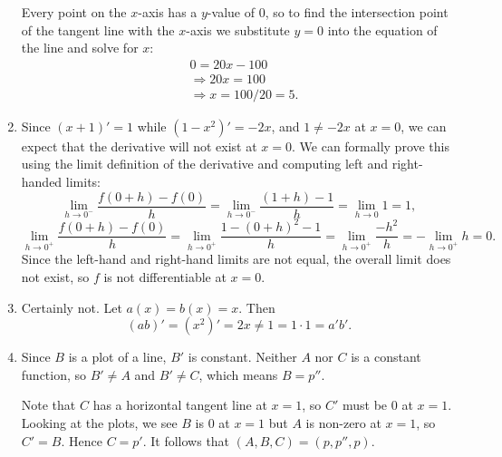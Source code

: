 \documentclass[12pt,a4paper]{article}
\newcommand{\rar}{\rightarrow}
\begin{document}
\begin{enumerate}
Every point on the $x$-axis has a $y$-value of 0, so to find the intersection point of the tangent line with the $x$-axis we substitute $y = 0$ into the equation of the line and solve for $x$:
\begin{equation*}
\begin{split}
		&0 	= 20x - 100 \\
		&\Rightarrow 20x = 100 \\
		&\Rightarrow x = 100/20 = 5.
\end{split}
\end{equation*}
	\item Since $(x + 1)' = 1$ while $(1 - x^2)' = -2x$, and $1 \ne -2x$ at $x = 0$, we can expect that the derivative will not exist at $x = 0$. We can formally prove this using the limit definition of the derivative and computing left and right-handed limits:
\[
	\lim_{h \rar 0^-} \frac{f(0 + h) - f(0)}{h} = \lim_{h \rar 0^-} \frac{(1 + h) - 1}{h} = \lim_{h \rar 0}{1} = 1,
\]
\[
	\lim_{h \rar 0^+} \frac{f(0 + h) - f(0)}{h} = \lim_{h \rar 0^+} \frac{1 - (0 + h)^2 - 1}{h} = \lim_{h \rar 0^+} \frac{-h^2}{h} = -\lim_{h \rar 0^+} h = 0.
\]
Since the left-hand and right-hand limits are not equal, the overall limit does not exist, so $f$ is not differentiable at $x = 0$.
	\item Certainly not. Let $a(x) = b(x) = x$. Then
\[
	(ab)' = (x^2)' = 2x \ne 1 = 1\cdot 1 = a'b'.
\]
	\item Since $B$ is a plot of a line, $B'$ is constant. Neither $A$ nor $C$ is a constant function, so $B' \ne A$ and $B' \ne C$, which means $B = p''$.

Note that $C$ has a horizontal tangent line at $x = 1$, so $C'$ must be 0 at $x = 1$. Looking at the plots, we see $B$ is 0 at $x = 1$ but $A$ is non-zero at $x = 1$, so $C' = B$. Hence $C = p'$. It follows that $(A,B,C) = (p,p'',p)$.
\end{enumerate}
\end{document}
